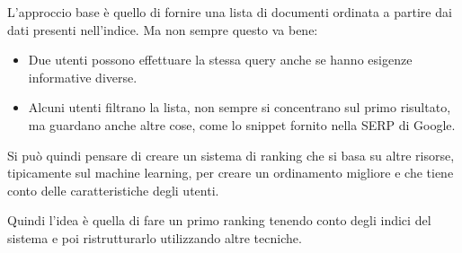 L'approccio base è quello di fornire una lista di documenti ordinata a partire dai dati presenti nell'indice.
Ma non sempre questo va bene:
\begin{itemize}
\item Due utenti possono effettuare la stessa query anche se hanno esigenze informative diverse.
\item Alcuni utenti filtrano la lista, non sempre si concentrano sul primo risultato, ma guardano anche altre cose, come lo snippet fornito nella SERP di Google.
\end{itemize}

Si può quindi pensare di creare un sistema di ranking che si basa su altre risorse, tipicamente sul machine learning, per creare un ordinamento migliore e che tiene conto delle caratteristiche degli utenti.

Quindi l'idea è quella di fare un primo ranking tenendo conto degli indici del sistema e poi ristrutturarlo utilizzando altre tecniche.
